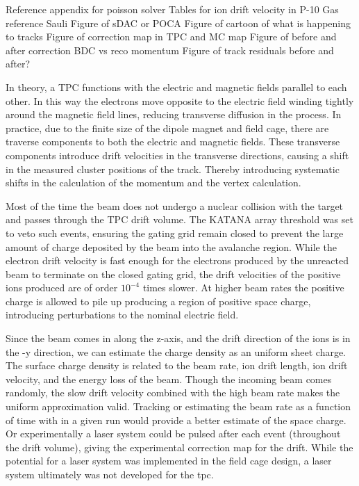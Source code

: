 Reference appendix for poisson solver 
Tables for ion drift velocity in P-10 Gas reference Sauli
Figure of sDAC or POCA 
Figure of cartoon of what is happening to tracks
Figure of correction map in TPC and MC map 
Figure of before and after correction BDC vs reco momentum
Figure of track residuals before and after?


In theory, a TPC functions with the electric and magnetic fields parallel to each other. In this way the electrons move opposite to the electric field winding tightly around the magnetic field lines, reducing transverse diffusion in the process. In practice, due to the finite size of the dipole magnet and field cage, there are traverse components to both the electric and magnetic fields. These transverse components introduce drift velocities in the transverse directions, causing a shift in the measured cluster positions of the track. Thereby introducing systematic shifts in the calculation of the momentum and the vertex calculation. 

Most of the time the beam does not undergo a nuclear collision with the target and passes through the TPC drift volume. The KATANA array threshold was set to veto such events, ensuring the gating grid remain closed to prevent the large amount of charge deposited by the beam into the avalanche region. While the electron drift velocity is fast enough for the electrons produced by the unreacted beam to terminate on the closed gating grid, the drift velocities of the positive ions produced are of order $10^{-4}$ times slower. At higher beam rates the positive charge is allowed to pile up producing a region of positive space charge, introducing perturbations to the nominal electric field. 

Since the beam comes in along the z-axis, and the drift direction of the ions is in the -y direction, we can estimate the charge density as an uniform sheet charge. The surface charge density is related to the beam rate, ion drift length, ion drift velocity, and the energy loss of the beam. Though the incoming beam comes randomly, the slow drift velocity combined with the high beam rate makes the uniform approximation valid. Tracking or estimating the beam rate as a function of time with in a given run would provide a better estimate of the space charge. Or experimentally a laser system could be pulsed after each event (throughout the drift volume), giving the experimental correction map for the drift. While the potential for a laser system was implemented in the field cage design, a laser system ultimately was not developed for the \spirit tpc. 

